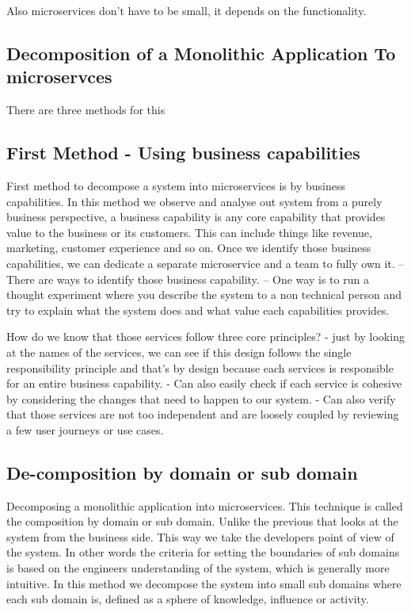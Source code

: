 \documentclass[a4paper, 11pt]{book}
\begin{document}
    Also microservices don't have to be small, it depends on the functionality.

    \subsection{Decomposition of a Monolithic Application To microservces}
    There are three methods for this

    \subsection{First Method - Using business capabilities}
    First method to decompose a system into microservices is by business capabilities.
    In this method we observe and analyse out system from a purely business perspective, a business capability is any core capability that provides value to the business or its customers.
    This can include things like revenue, marketing, customer experience and so on.
    Once we identify those business capabilities, we can dedicate a separate microservice and a team to fully own it.
    -- There are ways to identify those business capability.
    -- One way is to run a thought experiment where you describe the system to a non technical person and try to explain what the system does and what value each capabilities provides.

    How do we know that those services follow three core principles?
    - just by looking at the names of the services, we can see if this design follows the single responsibility principle
    and that's by design because each services is responsible for an entire business capability.
    - Can also easily check if each service is cohesive by considering the changes that need to happen to our system.
    - Can also verify that those services are not too independent and are loosely coupled by reviewing a few user journeys or use cases.

    \subsection{De-composition by domain or sub domain}
    Decomposing a monolithic application into microservices.
    This technique is called the composition by domain or sub domain.
    Unlike the previous that looks at the system from the business side.
    This way we take the developers point of view of the system.
    In other words the criteria for setting the boundaries of sub domains is based on the engineers understanding of the system, which is generally more intuitive.
    In this method we decompose the system into small sub domains where each sub domain is, defined as a sphere of knowledge, influence or activity.
\end{document}
